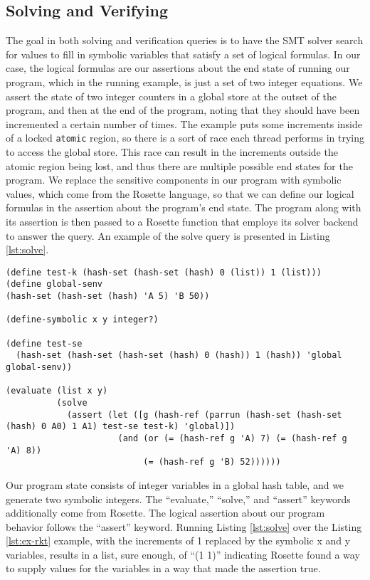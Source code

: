 \subsection{Solving and Verifying}
The goal in both solving and verification queries is to have the SMT solver search for values to fill in symbolic variables that satisfy a set of logical formulas.  In our case, the logical formulas are our assertions about the end state of running our program, which in the running example, is just a set of two integer equations.  We assert the state of two integer counters in a global store at the outset of the program, and then at the end of the program, noting that they should have been incremented a certain number of times.  The example puts some increments inside of a locked \texttt{atomic} region, so there is a sort of race each thread performs in trying to access the global store.  This race can result in the increments outside the atomic region being lost, and thus there are multiple possible end states for the program.  We replace the sensitive components in our program with symbolic values, which come from the Rosette language, so that we can define our logical formulas in the assertion about the program's end state.  The program along with its assertion is then passed to a Rosette function that employs its solver backend to answer the query.  An example of the solve query is presented in Listing \ref{lst:solve}.

\begin{figure*}[!h]
\begin{lstlisting}[label={lst:solve},caption={Setup and Test Environment.},captionpos=b,frame=single]
(define test-k (hash-set (hash-set (hash) 0 (list)) 1 (list)))
(define global-senv
(hash-set (hash-set (hash) 'A 5) 'B 50))

(define-symbolic x y integer?)

(define test-se
  (hash-set (hash-set (hash-set (hash) 0 (hash)) 1 (hash)) 'global global-senv))

(evaluate (list x y)
          (solve
            (assert (let ([g (hash-ref (parrun (hash-set (hash-set (hash) 0 A0) 1 A1) test-se test-k) 'global)])
                      (and (or (= (hash-ref g 'A) 7) (= (hash-ref g 'A) 8))
                           (= (hash-ref g 'B) 52))))))
\end{lstlisting}
\end{figure*}

Our program state consists of integer variables in a global hash table, and we generate two symbolic integers.  The ``evaluate,'' ``solve,'' and ``assert'' keywords additionally come from Rosette.  The logical assertion about our program behavior follows the ``assert'' keyword.  Running Listing \ref{lst:solve} over the Listing \ref{lst:ex-rkt} example, with the increments of 1 replaced by the symbolic x and y variables, results in a list, sure enough, of ``(1 1)'' indicating Rosette found a way to supply values for the variables in a way that made the assertion true.

